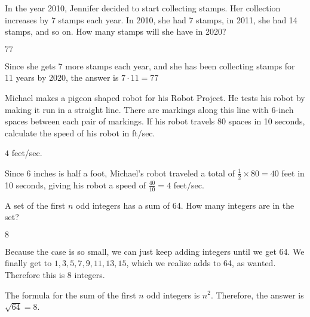 \documentclass[11pt]{article}
\begin{document}
\begin{problem} %
In the year 2010, Jennifer decided to start collecting stamps. Her collection increases by 7 stamps each year. In 2010, she had 7 stamps, in 2011, she had 14 stamps, and so on. How many stamps will she have in 2020?
\end{problem}
\begin{answer}
$\boxed{77}$
\end{answer}
\begin{solution}
Since she gets 7 more stamps each year, and she has been collecting stamps for 11 years by 2020, the answer is $7 \cdot 11 = \boxed{77}$
\end{solution}

\begin{problem} %
Michael makes a pigeon shaped robot for his Robot Project. He tests his robot by making it run in a straight line. There are markings along this line with 6-inch spaces between each pair of markings. If his robot travels 80 spaces in 10 seconds, calculate the speed of his robot in ft/sec.
\end{problem}
\begin{answer}
$\boxed{4}$ feet/sec.
\end{answer}
\begin{solution} Since 6 inches is half a foot, Michael's robot traveled a total of $\frac{1}{2} \times 80 = 40$ feet in 10 seconds, giving his robot a speed of $\frac{40}{10} = \boxed{4}$ feet/sec.
\end{solution}

\begin{problem} %
A set of the first $n$ odd integers has a sum of 64. How many integers are in the set?
\end{problem}
\begin{answer}
$\boxed{8}$
\end{answer}
\begin{solutionone}
Because the case is so small, we can just keep adding integers until we get 64. We finally get to $1,3,5,7,9,11,13,15$, which we realize adds to 64, as wanted. Therefore this is $\boxed{8}$ integers.
\end{solutionone}
\begin{solutiontwo}
The formula for the sum of the first $n$ odd integers is $n^2$. Therefore, the answer is $\sqrt{64} = \boxed{8}$.
\end{solutiontwo}
\end{document}
